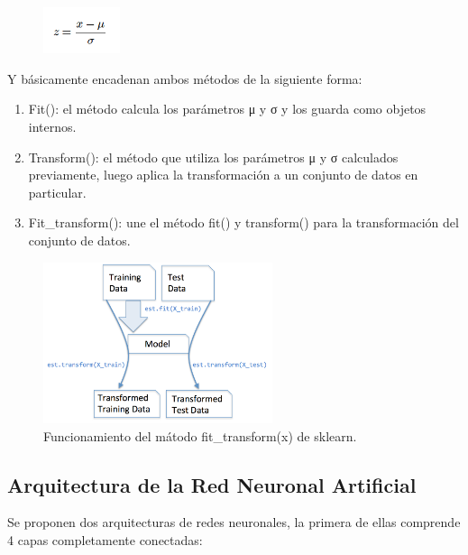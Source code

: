 \documentclass[runningheads]{llncs}
\begin{document}
\begin{figure}
	\begin{center}
		\includegraphics[width=0.2\textwidth]{images/for1.png}
	\end{center}
\end{figure}

Y b{\'a}sicamente encadenan ambos m{\'e}todos de la siguiente forma:

\begin{enumerate}
	\item Fit(): el m{\'e}todo calcula los par{\'a}metros μ y σ y los guarda como objetos internos.
	\item Transform(): el m{\'e}todo que utiliza los par{\'a}metros μ y σ calculados previamente, luego aplica la transformaci{\'o}n a un conjunto de datos en particular.
	\item Fit\_transform(): une el m{\'e}todo fit() y transform() para la transformaci{\'o}n del conjunto de datos.
\end{enumerate}

\begin{figure}
	\begin{center}
		\includegraphics[width=0.6\textwidth]{images/funcionamiento.png}
		\caption{Funcionamiento del m{\'a}todo fit\_transform(x) de sklearn.} \label{matrix}
	\end{center}
\end{figure}

\subsection{Arquitectura de la Red Neuronal Artificial}

Se proponen dos arquitecturas de redes neuronales, la primera de ellas comprende 4 capas completamente conectadas:
\end{document}

